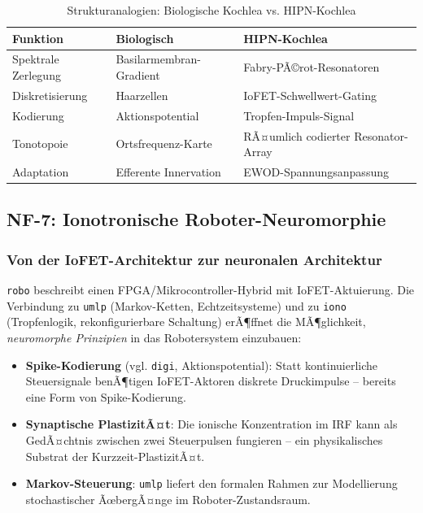 ﻿\documentclass[a4paper,12pt]{scrreprt}
\theoremstyle{definition}
\begin{document}
\begin{table}[H]
\caption{Strukturanalogien: Biologische Kochlea vs. HIPN-Kochlea}
\label{tab:kochlea}
\begin{tabular}{lll}
\toprule
\textbf{Funktion} & \textbf{Biologisch} & \textbf{HIPN-Kochlea} \\
\midrule
Spektrale Zerlegung & Basilarmembran-Gradient & Fabry-PÃ©rot-Resonatoren \\
Diskretisierung & Haarzellen & IoFET-Schwellwert-Gating \\
Kodierung & Aktionspotential & Tropfen-Impuls-Signal \\
Tonotopoie & Ortsfrequenz-Karte & RÃ¤umlich codierter Resonator-Array \\
Adaptation & Efferente Innervation & EWOD-Spannungsanpassung \\
\bottomrule
\end{tabular}
\end{table}

\subsection{NF-7: Ionotronische Roboter-Neuromorphie}

\subsubsection{Von der IoFET-Architektur zur neuronalen Architektur}

\texttt{robo} beschreibt einen FPGA/Mikrocontroller-Hybrid mit IoFET-Aktuierung.
Die Verbindung zu \texttt{umlp} (Markov-Ketten, Echtzeitsysteme) und
zu \texttt{iono} (Tropfenlogik, rekonfigurierbare Schaltung) erÃ¶ffnet die
MÃ¶glichkeit, \emph{neuromorphe Prinzipien} in das Robotersystem einzubauen:

\begin{itemize}
  \item \textbf{Spike-Kodierung} (vgl. \texttt{digi}, Aktionspotential):
    Statt kontinuierliche Steuersignale benÃ¶tigen IoFET-Aktoren diskrete
    Druckimpulse -- bereits eine Form von Spike-Kodierung.
  \item \textbf{Synaptische PlastizitÃ¤t}: Die ionische Konzentration im
    IRF kann als GedÃ¤chtnis zwischen zwei Steuerpulsen fungieren --
    ein physikalisches Substrat der Kurzzeit-PlastizitÃ¤t.
  \item \textbf{Markov-Steuerung}: \texttt{umlp} liefert den formalen
    Rahmen zur Modellierung stochastischer ÃœbergÃ¤nge im Roboter-Zustandsraum.
\end{itemize}
\end{document}
